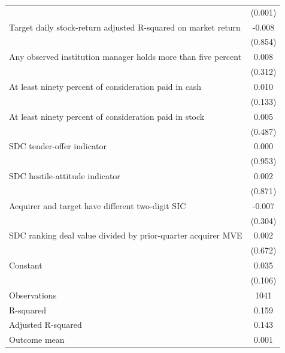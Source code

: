 {\begin{tabular}{l*{1}{c}}
                    &     (0.001)   \\
Target daily stock-return adjusted R-squared on market return&      -0.008   \\
                    &     (0.854)   \\
Any observed institution manager holds more than five percent&       0.008   \\
                    &     (0.312)   \\
At least ninety percent of consideration paid in cash&       0.010   \\
                    &     (0.133)   \\
At least ninety percent of consideration paid in stock&       0.005   \\
                    &     (0.487)   \\
SDC tender-offer indicator&       0.000   \\
                    &     (0.953)   \\
SDC hostile-attitude indicator&       0.002   \\
                    &     (0.871)   \\
Acquirer and target have different two-digit SIC&      -0.007   \\
                    &     (0.304)   \\
SDC ranking deal value divided by prior-quarter acquirer MVE&       0.002   \\
                    &     (0.672)   \\
Constant            &       0.035   \\
                    &     (0.106)   \\
\hline
Observations        &        1041   \\
R-squared           &       0.159   \\
Adjusted R-squared  &       0.143   \\
Outcome mean        &       0.001   \\
\hline\hline
\end{tabular}
}
